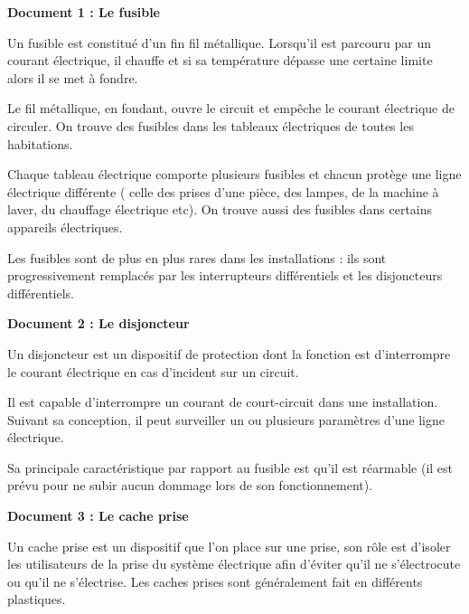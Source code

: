 \documentclass[10pt]{article}
\begin{document}

\large

\textbf{\color{DarkBlue} {Document 1 : Le fusible }}  

Un fusible est constitué d’un fin fil métallique. Lorsqu’il est parcouru par un
courant électrique, il chauffe et si sa température dépasse une certaine limite
alors il se met à fondre.

Le fil métallique, en fondant, ouvre le circuit et empêche
le courant électrique de circuler.
On trouve des fusibles dans les tableaux électriques de toutes les habitations.

Chaque tableau électrique comporte plusieurs fusibles et
chacun protège une ligne électrique différente ( celle des prises d’une pièce, des lampes, de la
machine à laver, du chauffage électrique etc). On trouve aussi des fusibles dans certains appareils
électriques.

Les fusibles sont de plus en plus rares dans les installations : ils sont progressivement remplacés
par les interrupteurs différentiels et les disjoncteurs différentiels. 

\vspace{5pt}

\textbf{\color{DarkBlue} {Document 2 : Le disjoncteur }}  

Un disjoncteur est un dispositif de protection dont la fonction est d'interrompre le
courant électrique en cas d'incident sur un circuit.

Il est capable d'interrompre un courant de court-circuit dans une installation.
Suivant sa conception, il peut surveiller un ou plusieurs paramètres d'une ligne électrique. 

Sa principale caractéristique par
rapport au fusible est qu'il est réarmable (il est prévu pour ne subir aucun dommage
lors de son fonctionnement).

\vspace{5pt}

\textbf{\color{DarkBlue} {Document 3 : Le cache prise }}

Un cache prise est un dispositif que l'on place sur une prise, son rôle est d'isoler les utilisateurs
de la prise du système électrique afin d'éviter qu'il ne s'électrocute ou qu'il ne s'électrise.
Les caches prises sont généralement fait en différents plastiques.
\end{document}
